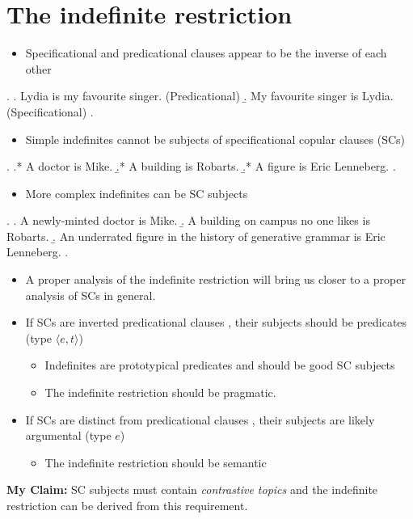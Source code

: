 \documentclass[letterpaper]{article}
\begin{document}
\section{The indefinite restriction}
\begin{itemize}
  \item Specificational and predicational clauses appear to be the inverse of each other
\end{itemize}
\ex.
\a. Lydia is my favourite singer. (Predicational)
\b. My favourite singer is Lydia. (Specificational)
\z.

\begin{itemize}
  \item Simple indefinites cannot be subjects of specificational copular clauses (SCs)
\end{itemize}
\ex.\label{ex:BadSCs}
\a.* A doctor is Mike.
\b.* A building is Robarts.
\b.* A figure is Eric Lenneberg.
\z.

\begin{itemize}
  \item More complex indefinites can be SC subjects
\end{itemize}
\ex.\label{ex:GoodSCs}
\a. A newly-minted doctor is Mike.
\b. A building on campus no one likes is Robarts.
\b. An underrated figure in the history of generative grammar is Eric Lenneberg.
\z.

\begin{itemize}
  \item A proper analysis of the indefinite restriction will bring us closer to a proper analysis of SCs in general.
  \item If SCs are inverted predicational clauses \parencite{moro1997raising,mikkelsen2004specifying}, their subjects should be predicates (type $\langle e,t\rangle$)
    \begin{itemize}
      \item Indefinites are prototypical predicates and should be good SC subjects
      \item The indefinite restriction should be pragmatic.
    \end{itemize}
  \item If SCs are distinct from predicational clauses \parencite{heycockkroch1999pseudocleft,heycock2012specification}, their subjects are likely argumental (type $e$)
    \begin{itemize}
      \item The indefinite restriction should be semantic
    \end{itemize}
\end{itemize}
\textbf{My Claim:} SC subjects must contain \textit{contrastive topics} and the indefinite restriction can be derived from this requirement.
\end{document}
